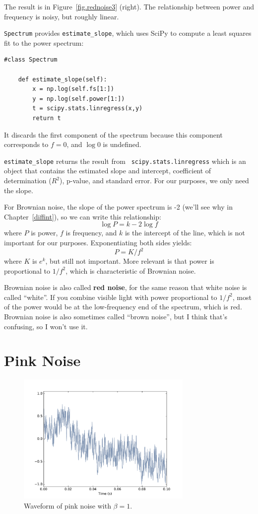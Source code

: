 \documentclass[12pt]{book}
\begin{document}
The result is in Figure~\ref{fig.rednoise3} (right).  The relationship between
power and frequency is noisy, but roughly linear.

{\tt Spectrum} provides \verb"estimate_slope", which uses SciPy to compute
a least squares fit to the power spectrum:

\begin{verbatim}
#class Spectrum

    def estimate_slope(self):
        x = np.log(self.fs[1:])
        y = np.log(self.power[1:])
        t = scipy.stats.linregress(x,y)
        return t
\end{verbatim}

It discards the first component of the spectrum because
this component corresponds to $f=0$, and $\log 0$ is undefined.

\verb"estimate_slope" returns the result from {\tt
  scipy.stats.linregress} which is an object that contains the
estimated slope and intercept, coefficient of determination ($R^2$),
p-value, and standard error.  For our purposes, we only need the
slope.

For Brownian noise, the slope of the power spectrum is -2 (we'll see
why in Chapter~\ref{diffint}), so we can write this relationship:
%
\[ \log P = k -2 \log f \]
%
where $P$ is power, $f$ is frequency, and $k$ is the intercept
of the line, which is not important for our purposes.
Exponentiating both sides yields:
%
\[ P = K / f^{2} \]
%
where $K$ is $e^k$, but still not important.  More relevant is
that power is proportional to $1/f^2$, which is characteristic
of Brownian noise.

Brownian noise is also called {\bf red noise}, for the same reason that
white noise is called ``white''.  If you combine visible light with
power proportional to $1/f^2$, most of the power
would be at the low-frequency end of the spectrum, which is red.
Brownian noise is also sometimes called ``brown noise'', but I think
that's confusing, so I won't use it.



\section{Pink Noise}
\label{pink}

\begin{figure}
\centerline{\includegraphics[height=2.5in]{figs/pinknoise0.pdf}}
\caption{Waveform of pink noise with $\beta=1$.}
\label{fig.pinknoise0}
\end{figure}
\end{document}
